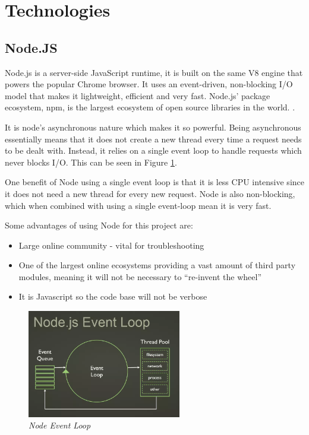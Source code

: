 \documentclass{article}
\begin{document}
\section{Technologies}
\subsection{Node.JS}
Node.js is a server-side JavaScript runtime, it is built on the same V8 engine that powers the popular Chrome browser. It uses an event-driven, non-blocking I/O model that makes it lightweight, efficient and very fast. Node.js' package ecosystem, npm, is the largest ecosystem of open source libraries in the world. \citep{Nodejs.org2016}.

It is node's asynchronous nature which makes it so powerful. Being asynchronous essentially means that it does not create a new thread every time a request needs to be dealt with. Instead, it relies on a single event loop to handle requests which never blocks I/O. This can be seen in Figure \ref{fig:event_loop}.


One benefit of Node using a single event loop is that it is less CPU intensive since it does not need a new thread for every new request. Node is also non-blocking, which when combined with using a single event-loop mean it is very fast.

Some advantages of using Node for this project are:

\begin{itemize}
  \item Large online community - vital for troubleshooting
  \item One of the largest online ecosystems providing a vast amount of third party modules, meaning it will not be necessary to ``re-invent the wheel''
  \item It is Javascript so the code base will not be verbose
\end{itemize}

\begin{figure}[!h]
\centering
\includegraphics*[width=0.6\textwidth]{images/event_loop}
\caption{\em Node Event Loop}
\label{fig:event_loop}
\end{figure}
\end{document}

